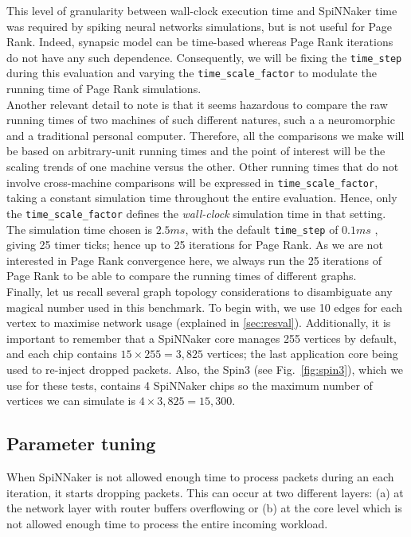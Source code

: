 This level of granularity between wall-clock execution time and SpiNNaker time was required by spiking neural networks simulations, but is not useful for Page Rank. Indeed, synapsic model can be time-based whereas Page Rank iterations do not have any such dependence. Consequently, we will be fixing the \texttt{time\_step} during this evaluation and varying the \texttt{time\_scale\_factor} to modulate the running time of Page Rank simulations. \\

Another relevant detail to note is that it seems hazardous to compare the raw running times of two machines of such different natures, such a a neuromorphic and a traditional personal computer. Therefore, all the comparisons we make will be based on arbitrary-unit running times and the point of interest will be the scaling trends of one machine versus the other. Other running times that do not involve cross-machine comparisons will be expressed in \texttt{time\_scale\_factor}, taking a constant simulation time throughout the entire evaluation. Hence, only the \texttt{time\_scale\_factor} defines the \textit{wall-clock} simulation time in that setting. The simulation time chosen is $2.5ms$, with the default \texttt{time\_step} of $0.1ms$ \cite{defts}, giving 25 timer ticks; hence up to 25 iterations for Page Rank. As we are not interested in Page Rank convergence here, we always run the 25 iterations of Page Rank to be able to compare the running times of different graphs. \\

Finally, let us recall several graph topology considerations to disambiguate any magical number used in this benchmark. To begin with, we use 10 edges for each vertex to maximise network usage (explained in \ref{sec:resval}). Additionally, it is important to remember that a SpiNNaker core manages 255 vertices by default, and each chip contains $15 \times 255 = 3,825$ vertices; the last application core being used to re-inject dropped packets. Also, the Spin3 (see Fig.~\ref{fig:spin3}), which we use for these tests, contains 4 SpiNNaker chips so the maximum number of vertices we can simulate is $4 \times 3,825 = 15,300$. \\

\subsection{Parameter tuning} \label{sec:partun}

When SpiNNaker is not allowed enough time to process packets during an each iteration, it starts dropping packets. This can occur at two different layers: (a) at the network layer with router buffers overflowing or (b) at the core level which is not allowed enough time to process the entire incoming workload.

